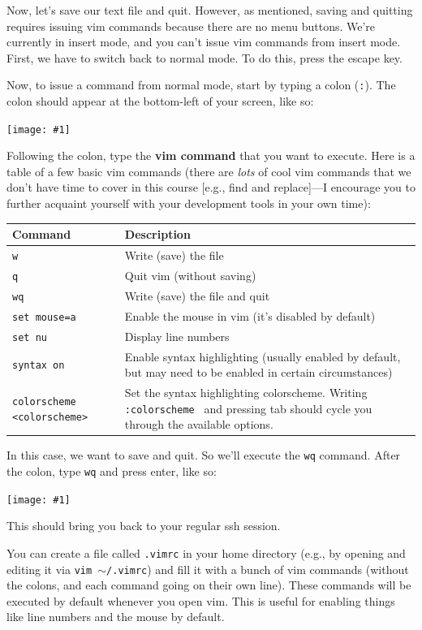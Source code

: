 \documentclass{article}
\newenvironment{tip}
    {\begin{tcolorbox}[title=Tip,colframe=white!70!blue,colback=white]}
    {\end{tcolorbox}}
\newcommand{\imagewithdefaults}[1]{\texttt{[image: \#1]}}
\begin{document}
Now, let's save our text file and quit. However, as mentioned, saving and quitting requires issuing vim commands because there are no menu buttons. We're currently in insert mode, and you can't issue vim commands from insert mode. First, we have to switch back to normal mode. To do this, press the escape key.

Now, to issue a command from normal mode, start by typing a colon (\texttt{:}). The colon should appear at the bottom-left of your screen, like so:

\imagewithdefaults{res/vim-command.png}

Following the colon, type the \textbf{vim command} that you want to execute. Here is a table of a few basic vim commands (there are \textit{lots} of cool vim commands that we don't have time to cover in this course [e.g., find and replace]---I encourage you to further acquaint yourself with your development tools in your own time):

\begin{tabular}{|p{}|p{}|}
    \hline
    Command & Description\\
    \hline
    \texttt{w} & Write (save) the file\\
    \hline
    \texttt{q} & Quit vim (without saving)\\
    \hline
    \texttt{wq} & Write (save) the file and quit\\
    \hline
    \texttt{set mouse=a} & Enable the mouse in vim (it's disabled by default)\\
    \hline
    \texttt{set nu} & Display line numbers\\
    \hline
    \texttt{syntax on} & Enable syntax highlighting (usually enabled by default, but may need to be enabled in certain circumstances)\\
    \hline
    \texttt{colorscheme <colorscheme>} & Set the syntax highlighting colorscheme. Writing \texttt{:colorscheme } and pressing tab should cycle you through the available options.\\
    \hline
\end{tabular}

In this case, we want to save and quit. So we'll execute the \texttt{wq} command. After the colon, type \texttt{wq} and press enter, like so:

\imagewithdefaults{res/vim-wq.png}

This should bring you back to your regular ssh session.

\begin{tip}
You can create a file called \texttt{.vimrc} in your home directory (e.g., by opening and editing it via \texttt{vim $\sim$/.vimrc}) and fill it with a bunch of vim commands (without the colons, and each command going on their own line). These commands will be executed by default whenever you open vim. This is useful for enabling things like line numbers and the mouse by default.
\end{tip}
\end{document}
